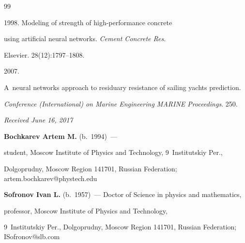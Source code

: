 {{\begin{thebibliography}{99}
    


 1998. Modeling of strength of high-performance concrete 

using artificial neural networks. \textit{Cement Concrete Res}. 

Elsevier. 28(12):1797--1808.

    


 2007. 

A~neural networks approach to residuary resistance of sailing yachts prediction. 

\textit{Conference (International) on Marine Engineering MARINE Proceedings}. 250.

\end{thebibliography}

} }





\vspace*{-3pt}



\hfill{\small\textit{Received June 16, 2017}}









\Contr



\noindent

\textbf{Bochkarev Artem M.} (b.\ 1994)~--- 

student, Moscow Institute of Physics and Technology, 9~Institutskiy Per., 

Dolgoprudny, Moscow Region 141701, Russian Federation; \mbox{artem.bochkarev@phystech.edu}



\vspace*{3pt}



\noindent

\textbf{Sofronov Ivan L.} (b.\ 1957)~--- Doctor of Science in physics and mathematics, 

professor, Moscow Institute of Physics and Technology, 

9~Institutskiy Per., Dolgoprudny, Moscow Region 141701, Russian Federation; \mbox{ISofronov@slb.com} 



\vspace*{3pt}



